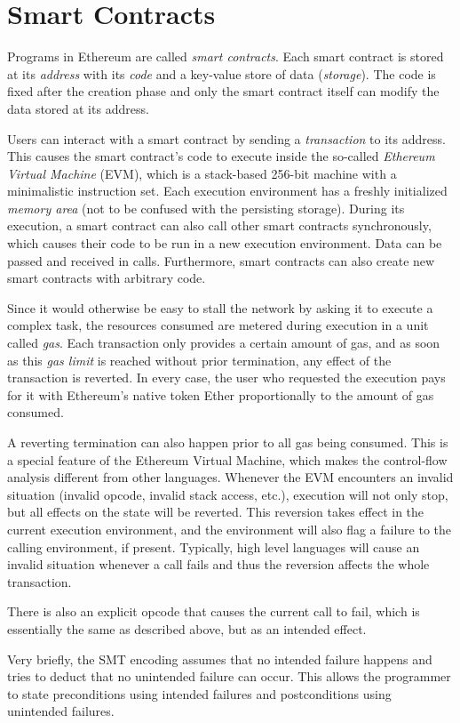 \section{Smart Contracts}
\label{section:smart_contracts}


Programs in Ethereum are called \emph{smart contracts}.
Each smart contract is stored at its \emph{address} with its \emph{code}
and a key-value store of data (\emph{storage}). The code is fixed after the creation phase
and only the smart contract itself can modify the data stored at its address.

Users can interact with a smart contract by sending a \emph{transaction}
to its address. This causes the smart contract's code to execute inside
the so-called \emph{Ethereum Virtual Machine} (EVM), which is a stack-based
256-bit machine with a minimalistic instruction set. Each execution environment
has a freshly initialized \emph{memory area} (not to be confused with the persisting
storage). During its execution, a smart contract can also call other
smart contracts synchronously, which causes their code to be run in
a new execution environment. Data can be passed and received in calls.
Furthermore, smart contracts can also create new smart contracts with
arbitrary code.

Since it would otherwise be easy to stall the network by asking it to
execute a complex task, the resources consumed are metered during execution
in a unit called \emph{gas}. Each transaction only provides a certain
amount of gas, and as soon as this \emph{gas limit} is reached without
prior termination, any effect of the transaction is reverted.
In every case, the user
who requested the execution pays for it with Ethereum's native token
Ether proportionally to the amount of gas consumed.

A reverting termination can also happen prior to all gas being consumed. This is
a special feature of the Ethereum Virtual Machine,
which makes the control-flow analysis different from other languages.
Whenever the EVM encounters an invalid situation (invalid opcode, invalid
stack access, etc.), execution will not only stop, but all effects on the
state will be reverted. This reversion takes effect in the current execution
environment, and the environment will also
flag a failure to the calling environment, if present. Typically, high level languages
will cause an invalid situation whenever a call fails and thus the reversion
affects the whole transaction.

There is also an explicit opcode that causes the current call to fail, which is
essentially the same as described above, but as an intended effect.


Very briefly, the SMT encoding assumes that no intended failure happens
and tries to deduct that no unintended failure can occur. This allows the
programmer to state preconditions using intended failures and postconditions
using unintended failures.
